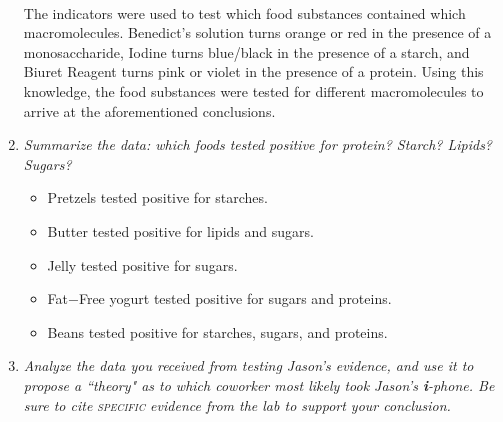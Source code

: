 \documentclass[12pt]{article}
\begin{document}
\begin{enumerate}
    \paragraph{} The indicators were used to test which food substances contained which macromolecules. Benedict's solution turns orange or red in the presence of a monosaccharide, Iodine turns blue/black in the presence of a starch, and Biuret Reagent turns pink or violet in the presence of a protein. Using this knowledge, the food substances were tested for different macromolecules to arrive at the aforementioned conclusions.
    \item \textit{Summarize the data: which foods tested positive for protein? Starch? Lipids? Sugars?}
        \begin{itemize} 
            \item Pretzels tested positive for starches. 
            \item Butter tested positive  for lipids and sugars. 
            \item Jelly tested positive for sugars. 
            \item Fat$-$Free yogurt tested positive for sugars and proteins. 
            \item Beans tested positive for starches, sugars, and proteins. 
        \end{itemize}
    \item \textit{Analyze the data you received from testing Jason's evidence, and use it to propose a ``\textit{theory}" as to which coworker most likely took Jason's \textbf{\textit{i}}-phone. Be sure to cite \textsc{specific} evidence from the lab to support your conclusion.} 

\end{enumerate}
\end{document}

